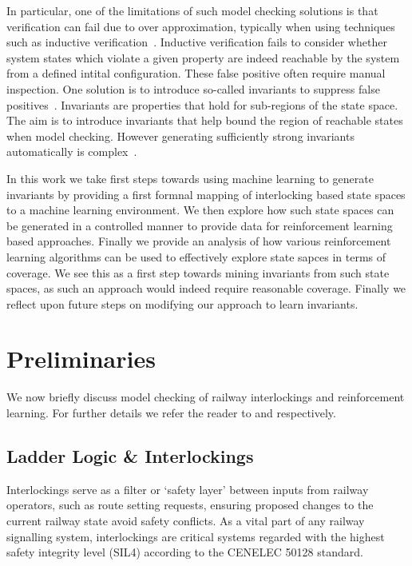 \documentclass[conference,compsoc]{IEEEtran}
\begin{document}
In particular, one of the limitations of such model checking solutions is that verification can fail due to over approximation, typically when using techniques such as inductive verification~\cite{}. Inductive verification fails to consider whether system states which violate a given property are indeed reachable by the system from a defined intital configuration. These false positive  often require manual inspection. One solution is to introduce so-called invariants to suppress false positives~\cite{1688959}. Invariants are properties that hold for sub-regions of the state space. The aim is to introduce invariants that help bound the region of reachable states when model checking. However generating sufficiently strong invariants automatically is complex~\cite{}. 

In this work we take first steps towards using machine learning to generate invariants by providing a first formnal mapping of interlocking based state spaces to a machine learning environment. We then explore how such state spaces can be generated in a controlled manner to provide data for reinforcement learning based approaches. Finally we provide an analysis of how various reinforcement learning algorithms can be used to effectively explore state sapces in terms of coverage. We see this as a first step towards mining invariants from such state spaces, as such an approach would indeed require reasonable coverage. Finally we reflect upon future steps on modifying our approach to learn invariants.



\section{Preliminaries}\label{sec:preliminaries}
We now briefly discuss  model checking of railway interlockings and reinforcement learning. For further details we refer the reader to \cite{kanso2009automated, james2013verification} and \cite{mnih2016asynchronous} respectively.

\subsection{Ladder Logic \& Interlockings}
Interlockings serve as a filter or ‘safety layer’ between inputs from railway operators, such as route setting requests, ensuring proposed changes to the current railway state avoid safety conflicts. As a vital part of any railway signalling system, interlockings are critical systems regarded with the highest safety integrity level
(SIL4) according to the CENELEC 50128 standard. 
\end{document}
